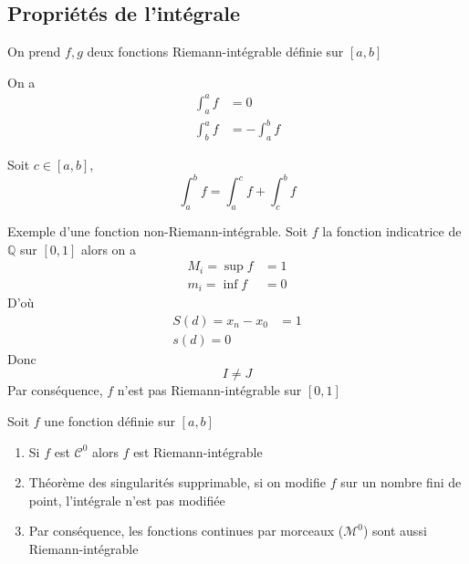 \documentclass[11pt,colorlinks]{book}
\theoremstyle{mytheoremstyle}
\theoremstyle{mytheoremstyle}
\theoremstyle{mytheoremstyle}
\theoremstyle{mytheoremstyle}
\theoremstyle{mytheoremstyle}
\theoremstyle{mytheoremstyle}
\theoremstyle{mytheoremstyle}
\theoremstyle{mytheoremstyle}
\theoremstyle{myproblemstyle}
\def\mbb#1{\mathbb{#1}}
\def\bQ{\mbb{Q}}
\begin{document}
  \subsection{Propriétés de l'intégrale}
  On prend $f,g$ deux fonctions Riemann-intégrable définie sur $[a,b]$
  \begin{prop}
    On a
    \begin{align*}
      \int_a^a f &= 0 \\ 
      \int_b^a f &= - \int_a^b f
    \end{align*}
  \end{prop}
  \begin{prop}
    Soit $c \in [a,b]$,
    \begin{equation*}
      \int_a^b f = \int_a^c f + \int_c^b f
    \end{equation*}
  \end{prop}
  \begin{ex}
    Exemple d'une fonction non-Riemann-intégrable. Soit $f$ la fonction indicatrice de $\bQ$ sur $[0,1]$ alors on a 
    \begin{align*}
      M_i = \sup f &= 1 \\ 
      m_i = \inf f &= 0
    \end{align*}
    D'où 
    \begin{align*}
      S(d) = x_n - x_0 &= 1 \\
      s(d) = 0
    \end{align*}
    Donc 
    \begin{equation*}
      I \not= J
    \end{equation*}
    Par conséquence, $f$ n'est pas Riemann-intégrable sur $[0,1]$
  \end{ex}
  \begin{theorem}
    Soit $f$ une fonction définie sur $[a,b]$
    \begin{enumerate}
      \item Si $f$ est $\mathcal{C}^0$ alors $f$ est Riemann-intégrable
      \item Théorème des singularités supprimable, si on modifie $f$ sur un nombre fini de point, l'intégrale n'est pas modifiée
      \item Par conséquence, les fonctions continues par morceaux ($\mathcal{M}^0$) sont aussi Riemann-intégrable
    \end{enumerate}
  \end{theorem}
\end{document}
